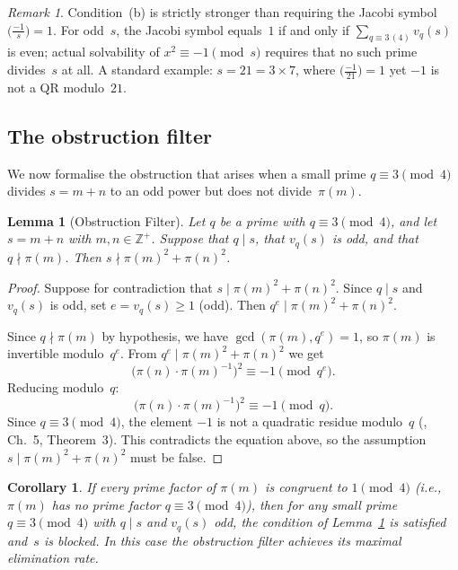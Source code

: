 \documentclass{amsart}
\newtheorem{lemma}[theorem]{Lemma}
\newtheorem{corollary}[theorem]{Corollary}
\theoremstyle{definition}
\theoremstyle{remark}
\newtheorem{remark}[theorem]{Remark}
\numberwithin{equation}{section}
\newcommand{\Zp}{\mathbb{Z}^{+}}
\newcommand{\vq}[1]{v_{#1}}
\begin{document}
\begin{remark}\label{rem:jacobi}
Condition~(b) is strictly stronger than requiring the Jacobi
symbol $\bigl(\frac{-1}{s}\bigr) = 1$.
For odd~$s$, the Jacobi symbol equals~$1$ if and only if
$\sum_{q \equiv 3\,(4)} \vq{q}(s)$ is even; actual solvability of
$x^2 \equiv -1 \pmod{s}$ requires that no such prime divides~$s$
at all.
A standard example: $s = 21 = 3 \times 7$, where
$\bigl(\frac{-1}{21}\bigr) = 1$ yet $-1$ is not a QR modulo~$21$.
\end{remark}

\subsection{The obstruction filter}

We now formalise the obstruction that arises when a small prime
$q \equiv 3 \pmod{4}$ divides $s = m + n$ to an odd power but
does not divide~$\pi(m)$.

\begin{lemma}[Obstruction Filter]\label{lem:obstruction}
Let $q$ be a prime with $q \equiv 3 \pmod{4}$, and let
$s = m + n$ with $m, n \in \Zp$.
Suppose that $q \mid s$, that $\vq{q}(s)$ is odd, and that
$q \nmid \pi(m)$.
Then $s \nmid \pi(m)^2 + \pi(n)^2$.
\end{lemma}

\begin{proof}
Suppose for contradiction that $s \mid \pi(m)^2 + \pi(n)^2$.
Since $q \mid s$ and $\vq{q}(s)$ is odd, set $e = \vq{q}(s) \ge 1$ (odd).
Then $q^e \mid \pi(m)^2 + \pi(n)^2$.

Since $q \nmid \pi(m)$ by hypothesis, we have
$\gcd(\pi(m), q^e) = 1$, so $\pi(m)$ is invertible modulo~$q^e$.
From $q^e \mid \pi(m)^2 + \pi(n)^2$ we get
\[
\bigl(\pi(n) \cdot \pi(m)^{-1}\bigr)^2 \equiv -1 \pmod{q^e}.
\]
Reducing modulo~$q$:
\[
\bigl(\pi(n) \cdot \pi(m)^{-1}\bigr)^2 \equiv -1 \pmod{q}.
\]
Since $q \equiv 3 \pmod{4}$, the element $-1$ is not a quadratic
residue modulo~$q$ (\cite{IrelandRosen}, Ch.~5, Theorem~3).
This contradicts the equation above, so the assumption
$s \mid \pi(m)^2 + \pi(n)^2$ must be false.
\end{proof}

\begin{corollary}\label{cor:maxobstruction}
If every prime factor of $\pi(m)$ is congruent to $1 \pmod{4}$
\textup{(}i.e., $\pi(m)$ has no prime factor $q \equiv 3 \pmod{4}$\textup{)},
then for any small prime $q \equiv 3 \pmod{4}$ with $q \mid s$
and $\vq{q}(s)$ odd, the condition of
Lemma~\textup{\ref{lem:obstruction}} is satisfied and~$s$ is
blocked.
In this case the obstruction filter achieves its maximal
elimination rate.
\end{corollary}
\end{document}
